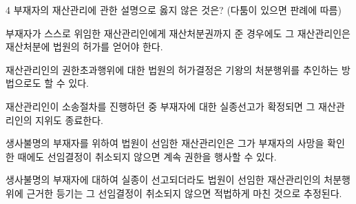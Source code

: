 \begin{question}{4}
부재자의 재산관리에 관한 설명으로 옳지 않은 것은? (다툼이 있으면 판례에 따름)
\begin{choices}
  \item 부재자가 스스로 위임한 재산관리인에게 재산처분권까지 준 경우에도 그 재산관리인은 재산처분에 법원의 허가를 얻어야 한다.
  \item 재산관리인의 권한초과행위에 대한 법원의 허가결정은 기왕의 처분행위를 추인하는 방법으로도 할 수 있다.
  \item 재산관리인이 소송절차를 진행하던 중 부재자에 대한 실종선고가 확정되면 그 재산관리인의 지위도 종료한다.
  \item 생사불명의 부재자를 위하여 법원이 선임한 재산관리인은 그가 부재자의 사망을 확인한 때에도 선임결정이 취소되지 않으면 계속 권한을 행사할 수 있다.
  \item 생사불명의 부재자에 대하여 실종이 선고되더라도 법원이 선임한 재산관리인의 처분행위에 근거한 등기는 그 선임결정이 취소되지 않으면 적법하게 마친 것으로 추정된다.
\end{choices}
\end{question}
